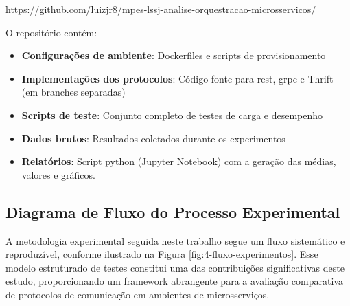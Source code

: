 \begin{center}
\url{https://github.com/luizjr8/mpes-lssj-analise-orquestracao-microsservicos/}
\end{center}

O repositório contém:

\begin{itemize}
\item \textbf{Configurações de ambiente}: Dockerfiles e scripts de provisionamento
\item \textbf{Implementações dos protocolos}: Código fonte para \acrshort{rest}, \acrshort{grpc} e Thrift (em branches separadas)
\item \textbf{Scripts de teste}: Conjunto completo de testes de carga e desempenho
\item \textbf{Dados brutos}: Resultados coletados durante os experimentos
\item \textbf{Relatórios}: Script python (Jupyter Notebook) com a geração das médias, valores e gráficos.
\end{itemize}

\subsection{Diagrama de Fluxo do Processo Experimental}
\label{subsec:diagrama_fluxo}

A metodologia experimental seguida neste trabalho segue um fluxo sistemático e reproduzível, conforme ilustrado na Figura \ref{fig:4-fluxo-experimentos}. Esse modelo estruturado de testes constitui uma das contribuições significativas deste estudo, proporcionando um framework abrangente para a avaliação comparativa de protocolos de comunicação em ambientes de microsserviços.


